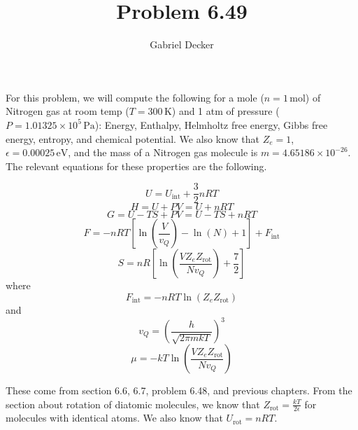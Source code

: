 \documentclass[12pt]{article}
\title{Problem 6.49}
\author{Gabriel Decker}
\newcommand{\atmP}{1.01325\times10^5\,\text{Pa}}
\begin{document}
\maketitle
\begin{flushleft}


For this problem, we will compute the following for a mole ($n=1\,\text{mol}$) of Nitrogen gas at room temp ($T=300\,\text{K}$) and 1 atm of pressure ($P=\atmP$):
Energy, Enthalpy, Helmholtz free energy, Gibbs free energy, entropy, and chemical potential.
We also know that $Z_e=1$, $\epsilon=0.00025\,\text{eV}$, and the mass of a Nitrogen gas molecule is $m=4.65186\times10^{-26}$.
The relevant equations for these properties are the following.


\begin{equation}
    U=U_\text{int}+\frac{3}{2}nRT
\end{equation}
\begin{equation}
    H=U+PV=U+nRT
\end{equation}
\begin{equation}
    G=U-TS+PV=U-TS+nRT
\end{equation}
\begin{equation}
    F=-nRT[\ln(\frac{V}{v_Q})-\ln(N)+1]+F_\text{int}
\end{equation}
\begin{equation}
    S=nR\left[\ln\left(\frac{VZ_eZ_\text{rot}}{Nv_Q}\right)+\frac{7}{2}\right]
\end{equation}
where
\begin{equation}
    F_\text{int}=-nRT\ln(Z_eZ_\text{rot})
\end{equation}
and
\begin{equation}
    v_Q=\left(\frac{h}{\sqrt{2\pi mkT}}\right)^3
\end{equation}
\begin{equation}
    \mu=-kT\ln\left(\frac{VZ_eZ_\text{rot}}{Nv_Q}\right)
\end{equation}

These come from section 6.6, 6.7, problem 6.48, and previous chapters.
From the section about rotation of diatomic molecules, we know that $Z_\text{rot}=\frac{kT}{2\epsilon}$ for molecules with identical atoms. We also know that $U_\text{rot}=nRT$.\\~\\


\end{flushleft}
\end{document}
